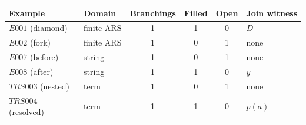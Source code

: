 \small
\begin{tabular}{@{}llcccl@{}}
\toprule
Example & Domain & Branchings & Filled & Open & Join witness \\
\midrule
$E001$ (diamond)       & finite ARS & 1 & 1 & 0 & $D$ \\
$E002$ (fork)          & finite ARS & 1 & 0 & 1 & none \\
$E007$ (before)        & string     & 1 & 0 & 1 & none \\
$E008$ (after)         & string     & 1 & 1 & 0 & $y$ \\
$TRS003$ (nested)      & term       & 1 & 0 & 1 & none \\
$TRS004$ (resolved)    & term       & 1 & 1 & 0 & $p(a)$ \\
\bottomrule
\end{tabular}

